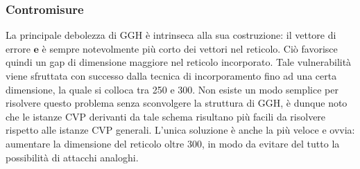 \subsubsection{Contromisure}
La principale debolezza di GGH è intrinseca alla sua costruzione: il vettore di errore
$\mathbf{e}$ è sempre notevolmente più corto dei vettori nel reticolo. Ciò favorisce quindi
un gap di dimensione maggiore nel reticolo incorporato. Tale vulnerabilità viene sfruttata
con successo dalla tecnica di incorporamento fino ad una certa dimensione, la quale si 
colloca tra 250 e 300. Non esiste un modo semplice per risolvere questo problema senza 
sconvolgere la struttura di GGH, è dunque noto che le istanze CVP derivanti da tale schema
risultano più facili da risolvere rispetto alle istanze CVP generali. L'unica soluzione 
è anche la più veloce e ovvia: aumentare la dimensione del reticolo oltre 300, in modo da
evitare del tutto la possibilità di attacchi analoghi. 

